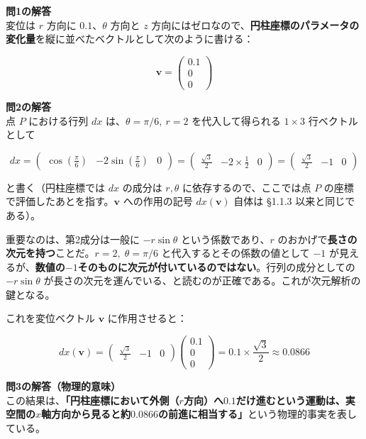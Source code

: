 \documentclass[a4paper,12pt,openany]{book}
\begin{document}
\textbf{問1の解答}\\
変位は \(r\) 方向に \(0.1\)、\(\theta\) 方向と \(z\)
方向にはゼロなので、\textbf{円柱座標のパラメータの変化量}を縦に並べたベクトルとして次のように書ける：

\[
\mathbf{v} = \begin{pmatrix} 0.1 \\ 0 \\ 0 \end{pmatrix}
\]

\textbf{問2の解答}\\
点 \(P\) における行列 \(dx\) は、\(\theta = \pi/6,\ r=2\)
を代入して得られる \(1\times 3\) 行ベクトルとして

\[
dx
=
\begin{pmatrix}
\cos(\frac{\pi}{6}) & -2\sin(\frac{\pi}{6}) & 0
\end{pmatrix}
=
\begin{pmatrix}
\frac{\sqrt{3}}{2} & -2 \times \frac{1}{2} & 0
\end{pmatrix}
=
\begin{pmatrix}
\frac{\sqrt{3}}{2} & -1 & 0
\end{pmatrix}
\]

と書く（円柱座標では \(dx\) の成分は \(r,\theta\)
に依存するので、ここでは点 \(P\)
の座標で評価したあとを指す。\(\mathbf{v}\) への作用の記号
\(dx(\mathbf{v})\) 自体は §1.1.3 以来と同じである）。

重要なのは、第2成分は一般に \(-r\sin\theta\) という係数であり、\(r\)
のおかげで\textbf{長さの次元を持つ}ことだ。\(r=2,\;\theta=\pi/6\)
と代入するとその係数の値として \(-1\)
が見えるが、\textbf{数値の}\(-1\)\textbf{そのものに次元が付いているのではない}。行列の成分としての
\(-r\sin\theta\)
が長さの次元を運んでいる、と読むのが正確である。これが次元解析の鍵となる。

これを変位ベクトル \(\mathbf{v}\) に作用させると：

\[
dx(\mathbf{v})
=
\begin{pmatrix}
\frac{\sqrt{3}}{2} & -1 & 0
\end{pmatrix}
\begin{pmatrix}
0.1\\
0\\
0
\end{pmatrix}
=
0.1 \times \frac{\sqrt{3}}{2}
\approx 0.0866
\]

\textbf{問3の解答（物理的意味）}\\
この結果は、\textbf{「円柱座標において外側（}\(r\)\textbf{方向）へ}\(0.1\)\textbf{だけ進むという運動は、実空間の}\(x\)\textbf{軸方向から見ると約}\(0.0866\)\textbf{の前進に相当する」}という物理的事実を表している。
\end{document}
